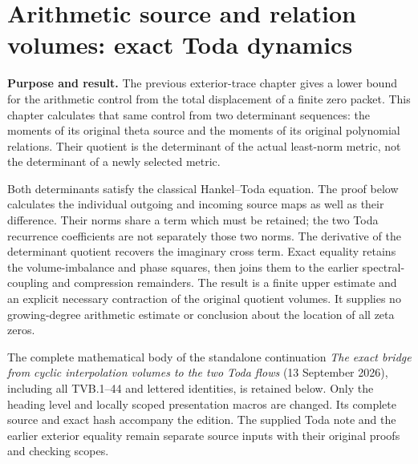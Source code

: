 \section{Arithmetic source and relation volumes: exact Toda dynamics}
\label{sec:arithmetic-toda-volumes}

\textbf{Purpose and result.}
The previous exterior-trace chapter gives a lower bound for the arithmetic
control from the total displacement of a finite zero packet. This chapter
calculates that same control from two determinant sequences: the moments
of its original theta source and the moments of its original polynomial
relations. Their quotient is the determinant of the actual least-norm
metric, not the determinant of a newly selected metric.

Both determinants satisfy the classical Hankel--Toda equation. The proof
below calculates the individual outgoing and incoming source maps as well
as their difference. Their norms share a term which must be retained;
the two Toda recurrence coefficients are not separately those two norms.
The derivative of the determinant quotient recovers the imaginary cross
term. Exact equality retains the volume-imbalance and phase squares, then
joins them to the earlier spectral-coupling and compression remainders.
The result is a finite upper estimate and an explicit necessary contraction
of the original quotient volumes. It supplies no growing-degree arithmetic
estimate or conclusion about the location of all zeta zeros.

The complete mathematical body of the standalone continuation
\emph{The exact bridge from cyclic interpolation volumes to the two Toda
flows} (13 September 2026), including all TVB.1--44 and lettered identities,
is retained below. Only the heading level and locally scoped presentation
macros are changed. Its complete source and exact hash accompany the
edition. The supplied Toda note and the earlier exterior equality remain
separate source inputs with their original proofs and checking scopes.

\begingroup
\setlength{\emergencystretch}{3em}
\def\C{\mathbb C}
\def\R{\mathbb R}
\def\tr{\operatorname{Tr}}
\def\Span{\operatorname{span}}
\def\im{\operatorname{im}}
\def\Alt{\operatorname{Alt}}
